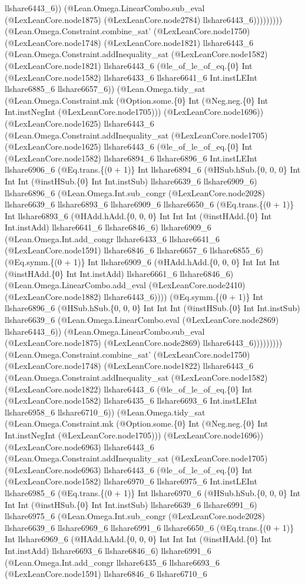 \documentclass[11pt]{article}
\begin{document}
llshare6443\_6)) (@Lean.Omega.LinearCombo.sub\_eval (@LexLeanCore.node1875) (@LexLeanCore.node2784) llshare6443\_6))))))))) (@Lean.Omega.Constraint.combine\_sat' (@LexLeanCore.node1750) (@LexLeanCore.node1748) (@LexLeanCore.node1821) llshare6443\_6 (@Lean.Omega.Constraint.addInequality\_sat (@LexLeanCore.node1582) (@LexLeanCore.node1821) llshare6443\_6 (@le\_of\_le\_of\_eq.\{0\} Int (@LexLeanCore.node1582) llshare6433\_6 llshare6641\_6 Int.instLEInt llshare6885\_6 llshare6657\_6)) (@Lean.Omega.tidy\_sat (@Lean.Omega.Constraint.mk (@Option.some.\{0\} Int (@Neg.neg.\{0\} Int Int.instNegInt (@LexLeanCore.node1705))) (@LexLeanCore.node1696)) (@LexLeanCore.node1625) llshare6443\_6 (@Lean.Omega.Constraint.addInequality\_sat (@LexLeanCore.node1705) (@LexLeanCore.node1625) llshare6443\_6 (@le\_of\_le\_of\_eq.\{0\} Int (@LexLeanCore.node1582) llshare6894\_6 llshare6896\_6 Int.instLEInt llshare6906\_6 (@Eq.trans.\{(0 + 1)\} Int llshare6894\_6 (@HSub.hSub.\{0, 0, 0\} Int Int Int (@instHSub.\{0\} Int Int.instSub) llshare6639\_6 llshare6909\_6) llshare6896\_6 (@Lean.Omega.Int.sub\_congr (@LexLeanCore.node2028) llshare6639\_6 llshare6893\_6 llshare6909\_6 llshare6650\_6 (@Eq.trans.\{(0 + 1)\} Int llshare6893\_6 (@HAdd.hAdd.\{0, 0, 0\} Int Int Int (@instHAdd.\{0\} Int Int.instAdd) llshare6641\_6 llshare6846\_6) llshare6909\_6 (@Lean.Omega.Int.add\_congr llshare6433\_6 llshare6641\_6 (@LexLeanCore.node1591) llshare6846\_6 llshare6657\_6 llshare6855\_6) (@Eq.symm.\{(0 + 1)\} Int llshare6909\_6 (@HAdd.hAdd.\{0, 0, 0\} Int Int Int (@instHAdd.\{0\} Int Int.instAdd) llshare6661\_6 llshare6846\_6) (@Lean.Omega.LinearCombo.add\_eval (@LexLeanCore.node2410) (@LexLeanCore.node1882) llshare6443\_6)))) (@Eq.symm.\{(0 + 1)\} Int llshare6896\_6 (@HSub.hSub.\{0, 0, 0\} Int Int Int (@instHSub.\{0\} Int Int.instSub) llshare6639\_6 (@Lean.Omega.LinearCombo.eval (@LexLeanCore.node2869) llshare6443\_6)) (@Lean.Omega.LinearCombo.sub\_eval (@LexLeanCore.node1875) (@LexLeanCore.node2869) llshare6443\_6))))))))) (@Lean.Omega.Constraint.combine\_sat' (@LexLeanCore.node1750) (@LexLeanCore.node1748) (@LexLeanCore.node1822) llshare6443\_6 (@Lean.Omega.Constraint.addInequality\_sat (@LexLeanCore.node1582) (@LexLeanCore.node1822) llshare6443\_6 (@le\_of\_le\_of\_eq.\{0\} Int (@LexLeanCore.node1582) llshare6435\_6 llshare6693\_6 Int.instLEInt llshare6958\_6 llshare6710\_6)) (@Lean.Omega.tidy\_sat (@Lean.Omega.Constraint.mk (@Option.some.\{0\} Int (@Neg.neg.\{0\} Int Int.instNegInt (@LexLeanCore.node1705))) (@LexLeanCore.node1696)) (@LexLeanCore.node6963) llshare6443\_6 (@Lean.Omega.Constraint.addInequality\_sat (@LexLeanCore.node1705) (@LexLeanCore.node6963) llshare6443\_6 (@le\_of\_le\_of\_eq.\{0\} Int (@LexLeanCore.node1582) llshare6970\_6 llshare6975\_6 Int.instLEInt llshare6985\_6 (@Eq.trans.\{(0 + 1)\} Int llshare6970\_6 (@HSub.hSub.\{0, 0, 0\} Int Int Int (@instHSub.\{0\} Int Int.instSub) llshare6639\_6 llshare6991\_6) llshare6975\_6 (@Lean.Omega.Int.sub\_congr (@LexLeanCore.node2028) llshare6639\_6 llshare6969\_6 llshare6991\_6 llshare6650\_6 (@Eq.trans.\{(0 + 1)\} Int llshare6969\_6 (@HAdd.hAdd.\{0, 0, 0\} Int Int Int (@instHAdd.\{0\} Int Int.instAdd) llshare6693\_6 llshare6846\_6) llshare6991\_6 (@Lean.Omega.Int.add\_congr llshare6435\_6 llshare6693\_6 (@LexLeanCore.node1591) llshare6846\_6 llshare6710\_6 
\end{document}
